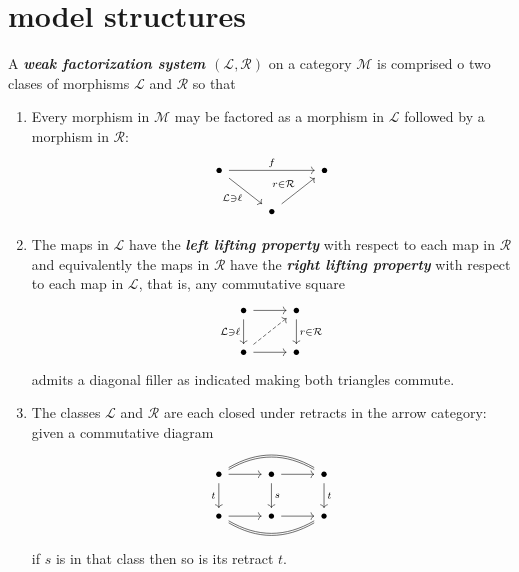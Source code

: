 \documentclass{article}
\numberwithin{equation}{section}
\newcommand{\Lc}{\mathcal{L}}
\newcommand{\Mc}{\mathcal{M}}
\newcommand{\Rc}{\mathcal{R}}
\begin{document}
\section{model structures}
\begin{defn}
	A \textbf{\textit{weak factorization system $(\Lc,\Rc)$}} on a category $\Mc$ is comprised o two clases of morphisms $\Lc$ and $\Rc$ so that
	\begin{enumerate}
		\item Every morphism in $\Mc$ may be factored as a morphism in $\Lc$ followed by a morphism in $\Rc$:
		\[\begin{tikzcd}
			\bullet\arrow[rr,"f"]\arrow[rd,"\Lc\ni\ell",swap]&&\bullet\\
			&\bullet\arrow[ru,"r\in\Rc"]
		\end{tikzcd}\]
		\item The maps in $\Lc$ have the \textbf{\textit{left lifting property}} with respect to each map in $\Rc$ and equivalently the maps in $\Rc$ have the \textbf{\textit{right lifting property}} with respect to each map in $\Lc$, that is, any commutative square
		\[\begin{tikzcd}
			\bullet\arrow[d,"\Lc\ni\ell",swap]\arrow[r]&\bullet\arrow[d,"r\in\Rc"]\\
			\bullet\arrow[ur,dashed]\arrow[r]&\bullet
		\end{tikzcd}\]
		admits a diagonal filler as indicated making both triangles commute.
		\item The classes $\Lc$ and $\Rc$ are each closed under retracts in the arrow category: given a commutative diagram
		\[\begin{tikzcd}
			\bullet\arrow[r]\arrow[d,"t",swap]\arrow[rr,bend left,no head,shift left=.3]\arrow[rr,bend left,no head,shift right=.3]&\bullet\arrow[r]\arrow[d,"s"]&\bullet\arrow[d,"t"]\\
			\bullet\arrow[r]\arrow[rr,bend right,no head, shift right=.3]\arrow[rr,bend right,no head, shift left=.3]&\bullet\arrow[r]&\bullet
		\end{tikzcd}\]
		if $s$ is in that class then so is its retract $t$.
	\end{enumerate}
\end{defn}
\end{document}
